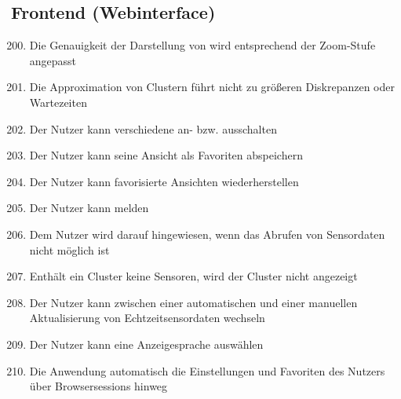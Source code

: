 \subsection{Frontend (Webinterface)}
\begin{enumerate}[label=\textbf{WK\arabic{enumi}0}]
	\setcounter{enumi}{199}
	\item Die Genauigkeit der Darstellung von  wird entsprechend der Zoom-Stufe angepasst %
	\item Die Approximation von Clustern führt nicht zu größeren Diskrepanzen oder Wartezeiten
	\item Der Nutzer kann verschiedene  an- bzw. ausschalten
	\item Der Nutzer kann seine Ansicht als Favoriten abspeichern
	\item Der Nutzer kann favorisierte Ansichten wiederherstellen
	\item Der Nutzer kann  melden
	\item Dem Nutzer wird darauf hingewiesen, wenn das Abrufen von Sensordaten nicht möglich ist
	\item Enthält ein Cluster keine Sensoren, wird der Cluster nicht angezeigt
	\item Der Nutzer kann zwischen einer automatischen und einer manuellen Aktualisierung von Echtzeitsensordaten wechseln
	\item Der Nutzer kann eine Anzeigesprache auswählen
	\item Die Anwendung  automatisch die Einstellungen und Favoriten des Nutzers über Browsersessions hinweg
\end{enumerate}

